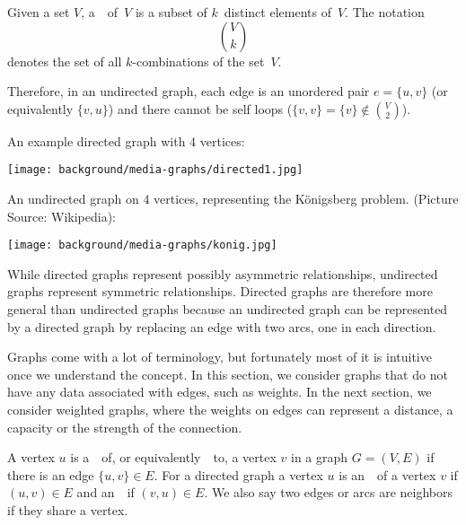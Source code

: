 \begin{note}
Given a set $V$, a~~of~$V$ is a subset of
$k$~distinct elements of~$V$.
%
The notation 
\[
\binom{V}{k}
\]
denotes the set of all $k$-combinations of the set~$V$. 
%

Therefore, in an undirected graph, each edge is an unordered pair
%
$e = \{ u,v \}$ (or equivalently $\{ v,u \}$)
%
and there cannot be self loops ($\{v,v\} = \{v\} \not\in
\binom{V}{2}$).
\end{note}

\begin{example}
\label{ex:bg::graphs::basics::examples}
An example directed graph with $4$ vertices:

\texttt{[image: background/media-graphs/directed1.jpg]} 

An undirected graph on $4$ vertices, representing the
  K\"onigsberg problem. (Picture Source: Wikipedia):

\texttt{[image: background/media-graphs/konig.jpg]}
\end{example}

\begin{remark}
While directed graphs represent possibly asymmetric relationships,
undirected graphs represent symmetric relationships.
%
Directed graphs are therefore more general than undirected graphs
because an undirected graph can be represented by a directed graph by
replacing an edge with two arcs, one in each direction.
\end{remark}

\begin{gram}
Graphs come with a lot of terminology, but fortunately most of it is
intuitive once we understand the concept.  
%
In this section, we consider graphs that do not have any data
associated with edges, such as weights.
%
In the next section, we consider weighted graphs, where the weights on
edges can represent a distance, a capacity or the strength of the
connection.
\end{gram}

\begin{definition}[Neighbors]
 A vertex $u$ is a~~of, or
 equivalently~~to, a vertex $v$ in a graph $G = (V,E)$
 if there is an edge $\{u,v\} \in E$.  For a directed graph a vertex
 $u$ is an~~of a vertex $v$ if $(u,v) \in E$ and
 an~~if $(v,u) \in E$.  We also say two edges or
 arcs are neighbors if they share a vertex.
\end{definition}


